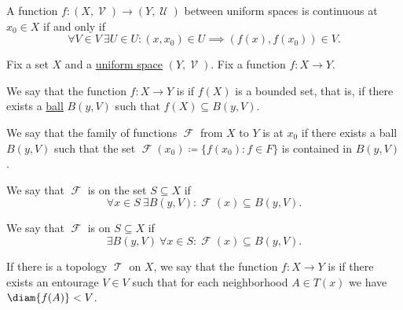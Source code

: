\begin{corollary}\label{thm:uniform_space_local_continuity}
  A function \( f: (X, \mscrV) \to (Y, \mscrU) \) between uniform spaces is continuous at \( x_0 \in X \) if and only if
  \begin{equation*}
    \forall V \in V \ \exists U \in U : (x, x_0) \in U \implies (f(x), f(x_0)) \in V.
  \end{equation*}
\end{corollary}

\begin{definition}\label{def:bounded_function}
  Fix a set \( X \) and a \hyperref[def:uniform_space]{uniform space} \( (Y, \mscrV) \). Fix a function \( f: X \to Y \).

  \begin{thmenum}
     We say that the function \( f: X \to Y \) is  if \( f(X) \) is a bounded set, that is, if there exists a \hyperref[def:entourage/ball]{ball} \( B(y, V) \) such that \( f(X) \subseteq B(y, V) \).

     We say that the family of functions \( \mscrF \) from \( X \) to \( Y \) is  at \( x_0 \) if there exists a ball \( B(y, V) \) such that the set \( \mscrF(x_0) \coloneqq \{ f(x_0) \colon f \in F \} \) is contained in \( B(y, V) \).

     We say that \( \mscrF \) is  on the set \( S \subseteq X \) if
    \begin{equation*}
      \forall x \in S \ \exists B(y, V) : \mscrF(x) \subseteq B(y, V).
    \end{equation*}

     We say that \( \mscrF \) is  on \( S \subseteq X \) if
    \begin{equation*}
      \exists B(y, V) \ \forall x \in S : \mscrF(x) \subseteq B(y, V).
    \end{equation*}

     If there is a topology \( \mscrT \) on \( X \), we say that the function \( f: X \to Y \) is  if there exists an entourage \( V \in V \) such that for each neighborhood \( A \in T(x) \) we have \( \diam{f(A)} < V \).
  \end{thmenum}
\end{definition}

